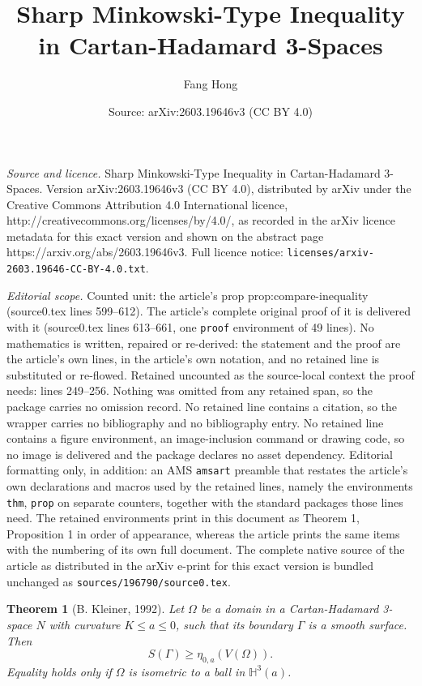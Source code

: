 \documentclass[10pt,a4paper]{amsart}
\title{Sharp Minkowski-Type Inequality in Cartan-Hadamard 3-Spaces}
\author{Fang Hong}
\date{Source: arXiv:2603.19646v3 (CC BY 4.0)}
\newtheorem{thm}{Theorem}
\newcommand{\HH}{\mathbb{H}}
\begin{document}
\maketitle

\noindent\emph{Source and licence.} Sharp Minkowski-Type Inequality in Cartan-Hadamard 3-Spaces. Version arXiv:2603.19646v3 (CC BY 4.0), distributed by arXiv under the Creative Commons Attribution 4.0 International licence, http://creativecommons.org/licenses/by/4.0/, as recorded in the arXiv licence metadata for this exact version and shown on the abstract page https://arxiv.org/abs/2603.19646v3. Full licence notice: \texttt{licenses/arxiv-2603.19646-CC-BY-4.0.txt}.\par\smallskip

\noindent\textit{Editorial scope.} Counted unit: the article's prop prop:compare-inequality (source0.tex lines 599--612). The article's complete original proof of it is delivered with it (source0.tex lines 613--661, one \texttt{proof} environment of 49 lines). No mathematics is written, repaired or re-derived: the statement and the proof are the article's own lines, in the article's own notation, and no retained line is substituted or re-flowed.  Retained uncounted as the source-local context the proof needs: lines 249--256.  Nothing was omitted from any retained span, so the package carries no omission record.  No retained line contains a citation, so the wrapper carries no bibliography and no bibliography entry.  No retained line contains a figure environment, an image-inclusion command or drawing code, so no image is delivered and the package declares no asset dependency.  Editorial formatting only, in addition: an AMS \texttt{amsart} preamble that restates the article's own declarations and macros used by the retained lines, namely the environments \texttt{thm}, \texttt{prop} on separate counters, together with the standard packages those lines need.  The retained environments print in this document as Theorem 1, Proposition 1 in order of appearance, whereas the article prints the same items with the numbering of its own full document.  The complete native source of the article as distributed in the arXiv e-print for this exact version is bundled unchanged as \texttt{sources/196790/source0.tex}.
		\begin{thm}[B. Kleiner, 1992]\label{thm:isoperi1}
			Let $\Omega$ be a domain in a Cartan-Hadamard 3-space $N$ with curvature $K\leq a\leq 0$, such that its boundary $\Gamma$ is a smooth surface. Then
			\begin{equation}
				\label{eq:isoperi1}
				S(\Gamma) \geq \eta_{0,a}(V(\Omega)).
			\end{equation}
			Equality holds only if $\Omega$ is isometric to a ball in $\HH^3(a)$.
		\end{thm}
\end{document}
